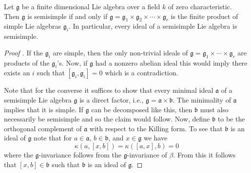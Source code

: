 \begin{theorem}
  Let $ \mathfrak{g} $ be a finite dimensional Lie algebra over a field $ k $ of zero characteristic. Then $ \mathfrak{g} $ is semisimple if and only if $ \mathfrak{g} = \mathfrak{g}_1 \times \mathfrak{g}_2 \times \cdots \times \mathfrak{g}_r $ is the finite product of simple Lie algebras $ \mathfrak{g}_i $. In particular, every ideal of a semisimple Lie algebra is semisimple.
\end{theorem}
\begin{proof}[Proof \cite{weibel1994homological}]
  If the $ \mathfrak{g}_i $ are simple, then the only non-trivial ideals of $ \mathfrak{g} = \mathfrak{g}_1 \times \cdots \times \mathfrak{g}_r $ are products of the $ \mathfrak{g}_i $'s. Now, if $ \mathfrak{g} $ had a nonzero abelian ideal this would imply there exists an $ i $ such that $ [\mathfrak{g}_i, \mathfrak{g}_i] =0 $ which is a contradiction.

  Note that for the converse it suffices to show that every minimal ideal $ \mathfrak{a} $ of a semisimple Lie algebra $ \mathfrak{g} $ is a direct factor, i.e., $ \mathfrak{g} = \mathfrak{a} \times \mathfrak{b} $. The minimality of $ \mathfrak{a} $ implies that it is simple. If $ \mathfrak{g} $ can be decomposed like this, then $ \mathfrak{b} $ must also necessarily be semisimple and so the claim would follow. Now, define $ \mathfrak{b} $ to be the orthogonal complement of $ \mathfrak{a} $ with respect to the Killing form. To see that $ \mathfrak{b} $ is an ideal of $ \mathfrak{g} $ note that for $ a \in \mathfrak{a} $, $ b \in \mathfrak{b} $, and $ x \in \mathfrak{g} $ we have
  \begin{equation}
    \kappa(a, [x, b]) = \kappa([a, x], b) = 0
  \end{equation}
  where the $ \mathfrak{g} $-invariance follows from the $ \mathfrak{g} $-invariance of $ \beta $. From this it follows that $ [x, b] \in \mathfrak{b} $ such that $ \mathfrak{b} $ is an ideal of $ \mathfrak{g} $.


\end{proof}
